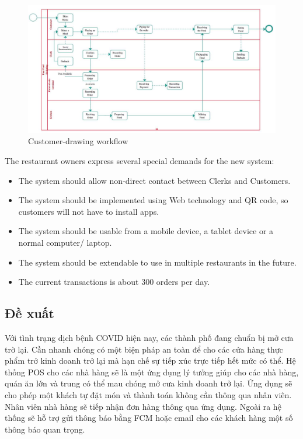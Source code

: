 \documentclass[a4paper]{article}
\begin{document}
\begin{figure}[!h]
    \begin{center}
        \includegraphics[scale=0.23]{Images/Screenshot from 2021-09-15 23-45-02.png}
    \end{center}
    \caption{Customer-drawing workflow}
\end{figure}

The restaurant owners express several special demands for the new system:

\begin{itemize}
    \item The system should allow non-direct contact between Clerks and Customers.
    \item The system should be implemented using Web technology and QR code, so customers will not have to install apps.
    \item The system should be usable from a mobile device, a tablet device or a normal computer/ laptop.
    \item The system should be extendable to use in multiple restaurants in the future.
    \item The current transactions is about 300 orders per day.
\end{itemize}
\pagebreak

\subsection{Đề xuất}

Với tình trạng dịch bệnh COVID hiện nay, các thành phố đang chuẩn bị mở cưa trờ lại. Cần nhanh chóng có một biện pháp an toàn để cho các cửa hàng thực phẩm trở kinh doanh trở lại mà hạn chế sự tiếp xúc trực tiếp hết mức có thể. Hệ thống POS cho các nhà hàng sẽ là một ứng dụng lý tưởng giúp cho các nhà hàng, quán ăn lớn và trung có thể mau chóng mở cưa kinh doanh trở lại. Ứng dụng sẽ cho phép một khách tự đặt món và thành toán không cần thông qua nhân viên. Nhân viên nhà hàng sẽ tiếp nhận đơn hàng thông qua ứng dụng. Ngoài ra hệ thống sẽ hỗ trợ gửi thông báo bằng FCM hoặc email cho các khách hàng một số thông báo quan trọng.
\end{document}
